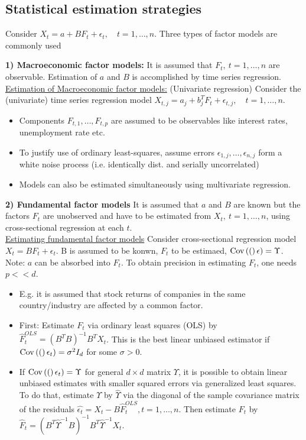 \subsection*{Statistical estimation strategies}
Consider $X_t = a + BF_t + \epsilon_t, \quad t=1,\dots,n$. Three types of factor models are commonly used

\textbf{1) Macroeconomic factor models:} It is assumed that $F_t, \ t = 1,\dots, n$ are observable. Estimation of
$a$ and $B$ is accomplished by time series regression. \\
\underline{Estimation of Macroeconomic factor models:} (Univariate regression) Consider the (univariate) time series regression model
$X_{t,j} = a_j + b_j^T F_t + \epsilon_{t,j}, \quad t = 1,\dots,n$.
\begin{itemize}
    \item Components $F_{t,1},\dots,F_{t,p}$ are assumed to be observables like interest rates, unemployment rate etc.
    \item To justify use of ordinary least-squares, assume errors $\epsilon_{1,j},\dots,\epsilon_{n,j}$ form a white noise process (i.e. identically dist. and serially uncorrelated)
    \item Models can also be estimated simultaneously using multivariate regression.
\end{itemize}

\textbf{2) Fundamental factor models} It is assumed that $a$ and $B$ are known but the factors $F_t$ are unobserved and have to be estimated from $X_t, \ t = 1,\dots,n$, using cross-sectional regression at each $t$. \\
\underline{Estimating fundamental factor models} Consider cross-sectional regression model $X_t = BF_t + \epsilon_t$. B is assumed to be konwn, $F_t$ to be estimaed, $\operatorname{Cov}\left(( \right)\epsilon) = \Upsilon$. Note: $a$ can be absorbed into $F_t$. To obtain precision in estimating $F_t$, one needs $p << d$.
\begin{itemize}
    \item E.g. it is assumed that stock returns of companies in the same country/industry are affected by a common factor.
    \item First: Estimate $F_t$ via ordinary least squares (OLS) by $\hat{F}_t^{OLS} = (B^TB)^{-1}B^TX_t$. This is the best linear unbiased estimator if $\operatorname{Cov}\left(( \right)\epsilon_t) = \sigma^2I_d$ for some $\sigma > 0$.
    \item If $\operatorname{Cov}\left(( \right)\epsilon_t) = \Upsilon$ for general $d\times d$ matrix $\Upsilon$, it is possible to obtain linear unbiased estimates with smaller squared errors via generalized least squares. To do that, estimate $\Upsilon$ by $\hat{\Upsilon}$ via the diagonal of the sample covariance matrix of the residuals $\hat{\epsilon_t} = X_t - B\hat{F}_t^{OLS} , t = 1, \dots ,n$. Then estimate $F_t$ by $\hat{F}_t = (B^T\hat{\Upsilon}^{-1}B)^{-1}B^T\hat{\Upsilon}^{-1}X_t$.
\end{itemize}

